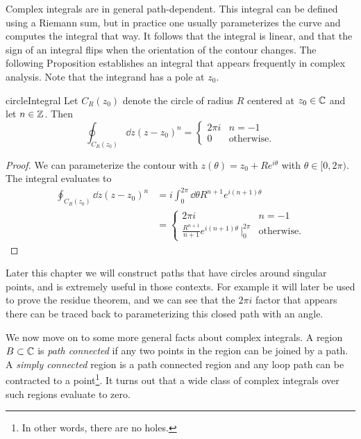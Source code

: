 Complex integrals are in general path-dependent.
This integral can be defined using a Riemann sum, but in practice one usually
parameterizes the curve and computes the integral that way.
It follows that the integral is linear, and that the sign of an integral
flips when the orientation of the contour changes.
The following Proposition establishes an integral that appears frequently
in complex analysis. Note that the integrand has a pole at $z_0$.
\begin{proposition}{}{circleIntegral}
Let $C_R(z_0)$ denote the circle of radius $R$ centered at $z_0\in\mathbb{C}$
and let $n\in\mathbb{Z}$. Then
$$
\oint_{C_R(z_0)}\dd{z}(z-z_0)^n=
\begin{cases}
 2\pi i & n=-1\\
 0      & \text{otherwise}.
\end{cases}
$$
\begin{proof}
We can parameterize the contour with $z(\theta)=z_0+Re^{i\theta}$
with $\theta\in[0,2\pi)$. The integral evaluates to
\begin{equation*}\begin{aligned}
\oint_{C_R(z_0)}\dd{z}(z-z_0)^n&=
i\int_0^{2\pi}\dd{\theta} R^{n+1}e^{i(n+1)\theta}\\
&=
\begin{cases}
 2\pi i & n=-1\\
 \frac{R^{n+1}}{n+1}e^{i(n+1)\theta}\,\big|_0^{2\pi} & \text{otherwise}. 
\end{cases}
\end{aligned}\end{equation*}
\end{proof}
\end{proposition}

Later this chapter we will construct paths that have circles around singular
points, and  is extremely useful in those contexts.
For example it will later be used to prove the residue 
theorem, and we can see that the $2\pi i$ factor that appears there can be traced
back to parameterizing this closed path with an angle.  

We now move on to some more general facts about complex integrals.
A region $B\subset\mathbb{C}$ is {\it path connected} if any two points in the region
can be joined by a path. A {\it simply connected} region is a path connected
region and any loop path can be contracted to a point\footnote{In other words,
there are no holes.}. It turns out that a wide class of complex integrals
over such regions evaluate to zero.

